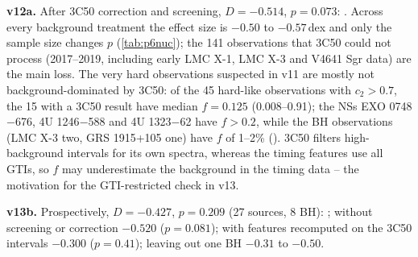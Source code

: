 \Primary{} \textbf{v12a.} After 3C50 correction and screening, $D=-0.514$, $p=0.073$: \NotDetected. Across every background treatment the
effect size is $-0.50$ to $-0.57$\,dex and only the sample size changes $p$ (\cref{tab:p6nuc}); the 141 observations that 3C50 could not
process (2017--2019, including early LMC X-1, LMC X-3 and V4641 Sgr data) are the main loss. The very hard observations suspected in v11 are
mostly not background-dominated by 3C50: of the 45 hard-like observations with $c_2>0.7$, the 15 with a 3C50 result have median $f=0.125$
(0.008--0.91); the NSs EXO 0748$-$676, 4U 1246$-$588 and 4U 1323$-$62 have $f>0.2$, while the BH observations (LMC X-3 two, GRS 1915+105 one) have
$f$ of 1--2\% (). \PostHoc{} 3C50 filters high-background intervals for its own spectra, whereas the
timing features use all GTIs, so $f$ may underestimate the background in the timing data -- the motivation for the GTI-restricted check
in v13.

\Primary{} \textbf{v13b.} Prospectively, $D=-0.427$, $p=0.209$ (27 sources, 8 BH): \NotDetected{}; without screening or correction $-0.520$
($p=0.081$); with features recomputed on the 3C50 intervals $-0.300$ ($p=0.41$); leaving out one BH $-0.31$ to $-0.50$.

